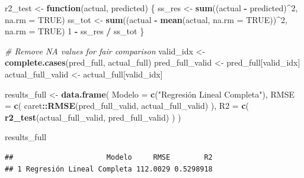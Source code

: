 \documentclass[
]{article}
\newenvironment{Shaded}{\begin{snugshade}}{\end{snugshade}}
\newcommand{\AttributeTok}[1]{\textcolor[rgb]{0.13,0.29,0.53}{#1}}
\newcommand{\CommentTok}[1]{\textcolor[rgb]{0.56,0.35,0.01}{\textit{#1}}}
\newcommand{\ConstantTok}[1]{\textcolor[rgb]{0.56,0.35,0.01}{#1}}
\newcommand{\ControlFlowTok}[1]{\textcolor[rgb]{0.13,0.29,0.53}{\textbf{#1}}}
\newcommand{\DecValTok}[1]{\textcolor[rgb]{0.00,0.00,0.81}{#1}}
\newcommand{\FunctionTok}[1]{\textcolor[rgb]{0.13,0.29,0.53}{\textbf{#1}}}
\newcommand{\NormalTok}[1]{#1}
\newcommand{\OtherTok}[1]{\textcolor[rgb]{0.56,0.35,0.01}{#1}}
\newcommand{\SpecialCharTok}[1]{\textcolor[rgb]{0.81,0.36,0.00}{\textbf{#1}}}
\newcommand{\StringTok}[1]{\textcolor[rgb]{0.31,0.60,0.02}{#1}}
\begin{document}
\begin{Shaded}
\begin{Highlighting}[]
\NormalTok{r2\_test }\OtherTok{\textless{}{-}} \ControlFlowTok{function}\NormalTok{(actual, predicted) \{}
\NormalTok{  ss\_res }\OtherTok{\textless{}{-}} \FunctionTok{sum}\NormalTok{((actual }\SpecialCharTok{{-}}\NormalTok{ predicted)}\SpecialCharTok{\^{}}\DecValTok{2}\NormalTok{, }\AttributeTok{na.rm =} \ConstantTok{TRUE}\NormalTok{)}
\NormalTok{  ss\_tot }\OtherTok{\textless{}{-}} \FunctionTok{sum}\NormalTok{((actual }\SpecialCharTok{{-}} \FunctionTok{mean}\NormalTok{(actual, }\AttributeTok{na.rm =} \ConstantTok{TRUE}\NormalTok{))}\SpecialCharTok{\^{}}\DecValTok{2}\NormalTok{, }\AttributeTok{na.rm =} \ConstantTok{TRUE}\NormalTok{)}
  \DecValTok{1} \SpecialCharTok{{-}}\NormalTok{ ss\_res }\SpecialCharTok{/}\NormalTok{ ss\_tot}
\NormalTok{\}}

\CommentTok{\# Remove NA values for fair comparison}
\NormalTok{valid\_idx }\OtherTok{\textless{}{-}} \FunctionTok{complete.cases}\NormalTok{(pred\_full, actual\_full)}
\NormalTok{pred\_full\_valid }\OtherTok{\textless{}{-}}\NormalTok{ pred\_full[valid\_idx]}
\NormalTok{actual\_full\_valid }\OtherTok{\textless{}{-}}\NormalTok{ actual\_full[valid\_idx]}

\NormalTok{results\_full }\OtherTok{\textless{}{-}} \FunctionTok{data.frame}\NormalTok{(}
  \AttributeTok{Modelo =} \FunctionTok{c}\NormalTok{(}\StringTok{"Regresión Lineal Completa"}\NormalTok{),}
  \AttributeTok{RMSE =} \FunctionTok{c}\NormalTok{(}
\NormalTok{    caret}\SpecialCharTok{::}\FunctionTok{RMSE}\NormalTok{(pred\_full\_valid, actual\_full\_valid)}
\NormalTok{  ),}
  \AttributeTok{R2 =} \FunctionTok{c}\NormalTok{(}
    \FunctionTok{r2\_test}\NormalTok{(actual\_full\_valid, pred\_full\_valid)}
\NormalTok{  )}
\NormalTok{)}

\NormalTok{results\_full}
\end{Highlighting}
\end{Shaded}

\begin{verbatim}
##                      Modelo     RMSE        R2
## 1 Regresión Lineal Completa 112.0029 0.5298918
\end{verbatim}
\end{document}
